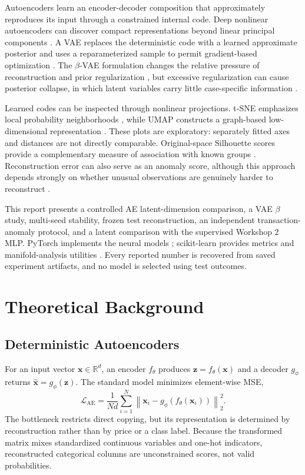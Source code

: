 \documentclass[11pt,letterpaper]{article}
\begin{document}
Autoencoders learn an encoder-decoder composition that approximately reproduces its input through a constrained internal code. Deep nonlinear autoencoders can discover compact representations beyond linear principal components \cite{hinton2006,goodfellow2016}. A VAE replaces the deterministic code with a learned approximate posterior and uses a reparameterized sample to permit gradient-based optimization \cite{kingma2014}. The $\beta$-VAE formulation changes the relative pressure of reconstruction and prior regularization \cite{higgins2017}, but excessive regularization can cause posterior collapse, in which latent variables carry little case-specific information \cite{lucas2019}.

Learned codes can be inspected through nonlinear projections. t-SNE emphasizes local probability neighborhoods \cite{vandermaaten2008}, while UMAP constructs a graph-based low-dimensional representation \cite{mcinnes2018}. These plots are exploratory: separately fitted axes and distances are not directly comparable. Original-space Silhouette scores provide a complementary measure of association with known groups \cite{rousseeuw1987}. Reconstruction error can also serve as an anomaly score, although this approach depends strongly on whether unusual observations are genuinely harder to reconstruct \cite{chalapathy2019}.

This report presents a controlled AE latent-dimension comparison, a VAE $\beta$ study, multi-seed stability, frozen test reconstruction, an independent transaction-anomaly protocol, and a latent comparison with the supervised Workshop 2 MLP. PyTorch implements the neural models \cite{paszke2019}; scikit-learn provides metrics and manifold-analysis utilities \cite{pedregosa2011}. Every reported number is recovered from saved experiment artifacts, and no model is selected using test outcomes.

\section{Theoretical Background}
\subsection{Deterministic Autoencoders}
For an input vector $\mathbf{x}\in\mathbb{R}^{d}$, an encoder $f_{\theta}$ produces $\mathbf{z}=f_{\theta}(\mathbf{x})$ and a decoder $g_{\phi}$ returns $\hat{\mathbf{x}}=g_{\phi}(\mathbf{z})$. The standard model minimizes element-wise MSE,
\begin{equation}
\mathcal{L}_{\mathrm{AE}}=\frac{1}{Nd}\sum_{i=1}^{N}\left\|\mathbf{x}_i-g_{\phi}\!\left(f_{\theta}(\mathbf{x}_i)\right)\right\|_2^2.
\label{eq:ae}
\end{equation}
The bottleneck restricts direct copying, but its representation is determined by reconstruction rather than by price or a class label. Because the transformed matrix mixes standardized continuous variables and one-hot indicators, reconstructed categorical columns are unconstrained scores, not valid probabilities.
\end{document}
